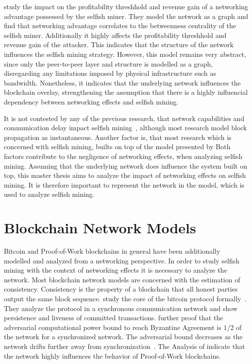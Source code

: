 \citeauthor{xiao_modeling} study the impact on the profitability threshhold and revenue gain of a networking advantage possessed by the selfish miner. They model the network as a graph and find that networking advantage correlates to the betweenness centrality of the selfish miner. Additionally it highly affects the profitability threshhold and revenue gain of the attacker. This indicates that the structure of the network influences the selfish mining strategy. However, this model remains very abstract, since only the peer-to-peer layer and structure is modelled as a graph, disregarding any limitations imposed by physical infrastructure such as bandwidth. Nonetheless, it indicates that the underlying network influences the blockchain overlay, strengthening the assumption that there is a highly influencial dependency between networking effects and selfish mining.

It is not contested by any of the previous research, that network capabilities and communication delay impact selfish mining~\cite{multi_sm}, although most research model block propagation as instantaneous.
Another factor is, that most research which is concerned with selfish mining, builts on top of the model presented by \citeauthor{optimal_sm}
Both factors contribute to the negligence of networking effects, when analyzing selfish mining.
Assuming that the underlying network does influence the system built on top, this master thesis aims to analyze the impact of networking effects on selfish mining. It is therefore important to represent the network in the model, which is used to analyze selfish mining.

\section{Blockchain Network Models}
Bitcoin and Proof-of-Work blockchains in general have been additionally modelled and analyzed from a networking perspective. In order to study selfish mining with the context of networking effects it is necessary to analyze the network. 
Most blockchain network models are concerned with the estimation of consistency. Consistency is the property of a blockchain that all honest parties output the same block sequence.
\citeauthor{garay2015bitcoin} study the core of the bitcoin protocol formally~\cite{garay2015bitcoin}. They analyze the protocol in a synchronous communication network and show persistence and liveness of committed transactions. \citeauthor{garay2015bitcoin} further proof that the adversarial computational power bound to reach Byzantine Agreement is $1/2$ of the network for a synchronized network. The adversarial bound decreases as the network drifts further away from synchronization~\cite{garay2015bitcoin}.
The Analysis of \citeauthor{garay2015bitcoin} indicate that the network highly influences the behavior of Proof-of-Work blockchains.

